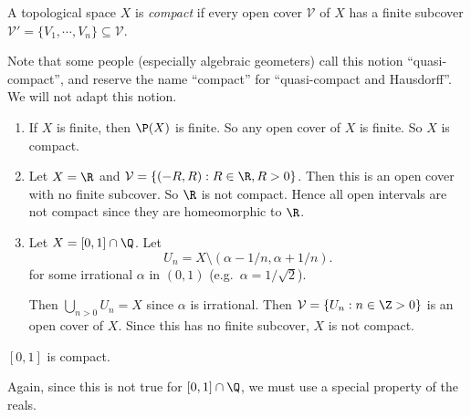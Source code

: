 \documentclass[a4paper]{article}
\begin{document}
\begin{defi}
  A topological space $X$ is \emph{compact} if every open cover $\mathcal{V}$ of $X$ has a finite subcover $\mathcal{V}' = \{V_1, \cdots, V_n\} \subseteq \mathcal{V}$.
\end{defi}
Note that some people (especially algebraic geometers) call this notion ``quasi-compact'', and reserve the name ``compact'' for ``quasi-compact and Hausdorff''. We will not adapt this notion.

\begin{eg}\leavevmode
  \begin{enumerate}
    \item If $X$ is finite, then $\P(X)$ is finite. So any open cover of $X$ is finite. So $X$ is compact.
    \item Let $X = \R$ and $\mathcal{V} = \{(-R, R) : R\in \R, R > 0\}$. Then this is an open cover with no finite subcover. So $\R$ is not compact. Hence all open intervals are not compact since they are homeomorphic to $\R$.
    \item Let $X = [0, 1]\cap \Q$. Let
      \[
        U_n = X\setminus(\alpha - 1/n, \alpha + 1/n).
      \]
      for some irrational $\alpha$ in $(0, 1)$ (e.g.\ $\alpha = 1/\sqrt{2}$).

      Then $\bigcup_{n > 0} U_n = X$ since $\alpha$ is irrational. Then $\mathcal{V} = \{U_n: n\in \Z > 0\}$ is an open cover of $X$. Since this has no finite subcover, $X$ is not compact.
  \end{enumerate}
\end{eg}

\begin{thm}
  $[0, 1]$ is compact.
\end{thm}
Again, since this is not true for $[0, 1]\cap \Q$, we must use a special property of the reals.
\end{document}
